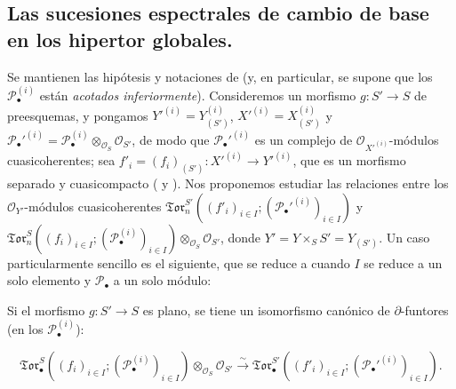 \subsection{Las sucesiones espectrales de cambio de base en los hipertor
globales.}

\begin{env}[6.9.1]
\label{III.6.9.1}
Se mantienen las hipótesis y notaciones de  (y, en
particular, se supone que los $\mathscr P_\bullet^{(i)}$ están \emph{acotados
inferiormente}). Consideremos un morfismo $g:S'\to S$ de preesquemas, y
pongamos
$Y'^{(i)}=Y_{(S')}^{(i)}$, $X'^{(i)}=X_{(S')}^{(i)}$ y
$\mathscr P_\bullet'^{(i)}=
\mathscr P_\bullet^{(i)}\otimes_{\mathscr O_S}\mathscr O_{S'}$,
de modo que $\mathscr P_\bullet'^{(i)}$ es un complejo de
$\mathscr O_{X'^{(i)}}$-módulos cuasicoherentes; sea
$f'_i=(f_i)_{(S')}:X'^{(i)}\to Y'^{(i)}$, que es un morfismo separado y
cuasicompacto ( y ). Nos proponemos
estudiar las relaciones entre los $\mathscr O_{Y'}$-módulos cuasicoherentes
$\mathfrak{Tor}_n^{S'}((f'_i)_{i\in I};
(\mathscr P_\bullet'^{(i)})_{i\in I})$ y
$\mathfrak{Tor}_n^S((f_i)_{i\in I};
(\mathscr P_\bullet^{(i)})_{i\in I})
\otimes_{\mathscr O_S}\mathscr O_{S'}$, donde
$Y'=Y\times_S S'=Y_{(S')}$. Un caso particularmente sencillo es el
siguiente, que se reduce a  cuando $I$ se reduce a un solo
elemento y $\mathscr P_\bullet$ a un solo módulo:
\end{env}

\begin{proposition}[6.9.2]
\label{III.6.9.2}
Si el morfismo $g:S'\to S$ es plano, se tiene un isomorfismo canónico de
$\partial$-funtores (en los $\mathscr P_\bullet^{(i)}$):

\label{III.6.9.2.1}
\[
  \mathfrak{Tor}_\bullet^S
  ((f_i)_{i\in I};(\mathscr P_\bullet^{(i)})_{i\in I})
  \otimes_{\mathscr O_S}\mathscr O_{S'}
  \xrightarrow{\sim}
  \mathfrak{Tor}_\bullet^{S'}
  ((f'_i)_{i\in I};(\mathscr P_\bullet'^{(i)})_{i\in I}).
  \tag{6.9.2.1}\label{III.6.9.2.1.fr}
\]

\end{proposition}

